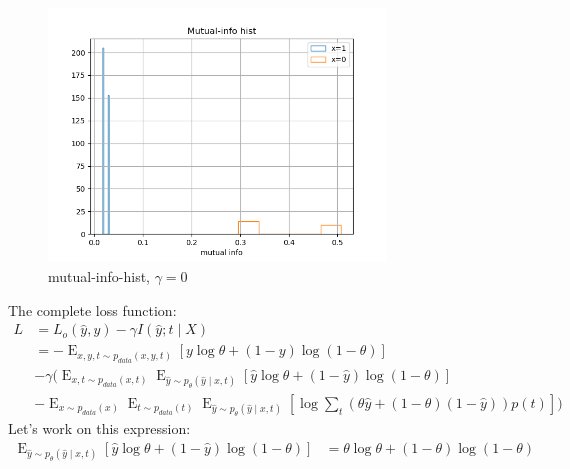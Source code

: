\documentclass[oneside,12pt]{article}
\begin{document}
%
\begin{figure}
    \centering
        \includegraphics[width=0.8\textwidth]{./mutualInfoHist_gamma_0}
        \caption{\label{fig:mutualInfoHist_gamma_0}mutual-info-hist, $\gamma=0$}
\end{figure}
%
The complete loss function:
%
\begin{equation}\label{eq:lossExample03}
    \begin{split}
        L &= L_o(\hat{y}, y) - \gamma I(\hat{y};t \mid X)\\
        &= -\operatorname{E}_{x,y,t \sim p_{data}(x,y,t)}\left[y \operatorname{log}\theta + (1-y)\operatorname{log}(1-\theta)\right]\\ 
        &- \gamma (\operatorname{E}_{x,t \sim p_{data}(x,t)} \operatorname{E}_{\hat{y} \sim p_\theta(\hat{y} \mid x,t)} \left[ 
        \hat{y}\operatorname{log}\theta + (1-\hat{y})\operatorname{log}(1-\theta) \right]\\
        &-\operatorname{E}_{x \sim p_{data}(x)} \operatorname{E}_{t \sim p_{data}(t)} \operatorname{E}_{\hat{y} \sim p_\theta(\hat{y} \mid x,t)} \left[ \operatorname{log} \sum_t 
        (\theta\hat{y} + (1-\theta)(1-\hat{y}))p(t) \right])
    \end{split}
\end{equation}
%
Let's work on this expression:
\begin{equation}
    \begin{split}
        \operatorname{E}_{\hat{y} \sim p_\theta(\hat{y} \mid x,t)} \left[\hat{y}\operatorname{log}\theta + (1-\hat{y})\operatorname{log}(1-\theta)\right] &= \theta\operatorname{log}\theta + (1-\theta)\operatorname{log}(1-\theta)\\
    \end{split}
\end{equation}
\end{document}
